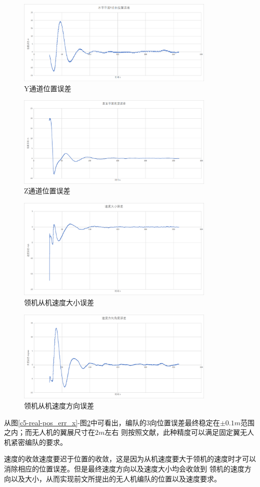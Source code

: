 \begin{figure}[H]
    \centering
    \includegraphics[width=0.85\textwidth]{figures/c5/c5-real-pos_err_y}
    \caption{Y通道位置误差}\label{c5-real-pos_err_y}
\end{figure}
\begin{figure}[H]
    \centering
    \includegraphics[width=0.85\textwidth]{figures/c5/c5-real-pos_err_z}
    \caption{Z通道位置误差}\label{c5-real-pos_err_z}
\end{figure}
\begin{figure}[H]
    \centering
    \includegraphics[width=0.85\textwidth]{figures/c5/c5-real-vel_err}
    \caption{领机从机速度大小误差}\label{c5-real-vel_err}
\end{figure}
\begin{figure}[H]
    \centering
    \includegraphics[width=0.85\textwidth]{figures/c5/c5-real-eta_err}
    \caption{领机从机速度方向误差}\label{c5-real-eta_err}
\end{figure}
从图\ref{c5-real-pos_err_x}-图\ref{c5-real-pos_err_z}中可看出，编队的3向位置误差最终稳定在$\pm0.1m$范围之内；而无人机的翼展尺寸在$2m$左右
则按照文献\cite{Zhang2017Aerodynamics}，此种精度可以满足固定翼无人机紧密编队的要求。

速度的收敛速度要迟于位置的收敛，这是因为从机速度要大于领机的速度时才可以消除相应的位置误差。但是最终速度方向以及速度大小均会收敛到
领机的速度方向以及大小，从而实现前文所提出的无人机编队的位置以及速度要求。
